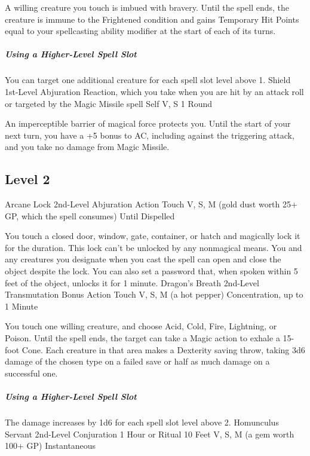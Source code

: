 \documentclass[letterpaper,openany,oneside,twocolumn]{book}
\begin{document}
A willing creature you touch is imbued with bravery. Until the spell ends, the creature is immune to the Frightened condition and gains Temporary Hit Points equal to your spellcasting ability modifier at the start of each of its turns.

\subparagraph*{Using a Higher-Level Spell Slot} You can target one additional creature for each spell slot level above 1.
\DndSpellHeader
  {Shield}
  {1st-Level Abjuration}
  {Reaction, which you take when you are hit by an attack roll or targeted by the Magic Missile spell}
  {Self}
  {V, S}
  {1 Round}

An imperceptible barrier of magical force protects you. Until the start of your next turn, you have a +5 bonus to AC, including against the triggering attack, and you take no damage from Magic Missile.

\subsection*{Level 2}
\DndSpellHeader
  {Arcane Lock}
  {2nd-Level Abjuration}
  {Action}
  {Touch}
  {V, S, M (gold dust worth 25+ GP, which the spell consumes)}
  {Until Dispelled}

You touch a closed door, window, gate, container, or hatch and magically lock it for the duration. This lock can't be unlocked by any nonmagical means. You and any creatures you designate when you cast the spell can open and close the object despite the lock. You can also set a password that, when spoken within 5 feet of the object, unlocks it for 1 minute.
\DndSpellHeader
  {Dragon's Breath}
  {2nd-Level Transmutation}
  {Bonus Action}
  {Touch}
  {V, S, M (a hot pepper)}
  {Concentration, up to 1 Minute}

You touch one willing creature, and choose Acid, Cold, Fire, Lightning, or Poison. Until the spell ends, the target can take a Magic action to exhale a 15-foot Cone. Each creature in that area makes a Dexterity saving throw, taking 3d6 damage of the chosen type on a failed save or half as much damage on a successful one.

\subparagraph*{Using a Higher-Level Spell Slot} The damage increases by 1d6 for each spell slot level above 2.
\DndSpellHeader
  {Homunculus Servant}
  {2nd-Level Conjuration}
  {1 Hour or Ritual}
  {10 Feet}
  {V, S, M (a gem worth 100+ GP)}
  {Instantaneous}
\end{document}
